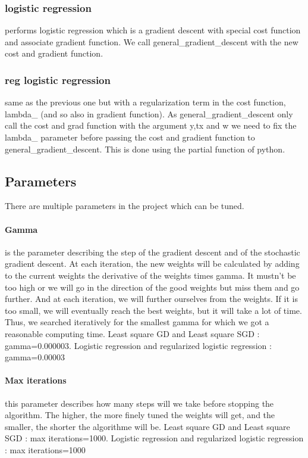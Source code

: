 \documentclass[10pt,conference,compsocconf]{IEEEtran}
\begin{document}
\subsubsection{logistic regression}

performs logistic regression which is a gradient descent with special cost function and associate gradient function. We call general\_gradient\_descent with the new cost and gradient function.

\subsubsection{reg logistic regression}
same as the previous one but with a regularization term in the cost function, lambda\_ (and so also in gradient function). As general\_gradient\_descent only call the cost and grad function with the argument y,tx and w we need to fix the lambda\_ parameter before passing the cost and gradient function to general\_gradient\_descent. This is done using the partial function of python.

\subsection{Parameters}
There are multiple parameters in the project which can be tuned. 
\paragraph{Gamma} is the parameter describing the step of the gradient descent and of the stochastic gradient descent. At each iteration, the new weights will be calculated by adding to the current weights the derivative of the weights times gamma. It mustn’t be too high or we will go in the direction of the good weights but miss them and go further. And at each iteration, we will further ourselves from the weights. If it is too small, we will eventually reach the best weights, but it will take a lot of time. Thus, we searched iteratively for the smallest gamma for which we got a reasonable computing time.
Least square GD and Least square SGD : gamma=0.000003.
Logistic regression and regularized logistic regression : gamma=0.00003
\paragraph{Max iterations} this parameter describes how many steps will we take before stopping the algorithm. The higher, the more finely tuned the weights will get, and the smaller, the shorter the algorithme will be. 
Least square GD and Least square SGD : max iterations=1000.
Logistic regression and regularized logistic regression :  max iterations=1000
\end{document}
